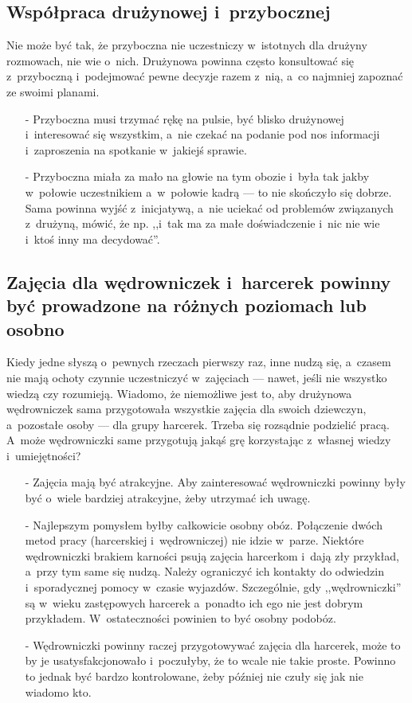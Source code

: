 \subsection{Współpraca drużynowej i~przybocznej}
Nie może być tak, że przyboczna nie uczestniczy w~istotnych dla drużyny rozmowach, nie wie o~nich. Drużynowa powinna często konsultować się z~przyboczną i~podejmować pewne decyzje razem z~nią, a~co najmniej zapoznać ze swoimi planami.
\begin{itemize}
\item[-] Przyboczna musi trzymać rękę na pulsie, być blisko drużynowej i~interesować się wszystkim, a~nie czekać na podanie pod nos informacji i~zaproszenia na spotkanie w~jakiejś sprawie.
\item[-] Przyboczna miała za mało na głowie na tym obozie i~była tak jakby w~połowie uczestnikiem a~w~połowie kadrą --- to nie skończyło się dobrze. Sama powinna wyjść z~inicjatywą, a~nie uciekać od problemów związanych z~drużyną, mówić, że np. ,,i~tak ma za małe doświadczenie i~nic nie wie i~ktoś inny ma decydować''.
\end{itemize}
\subsection{Zajęcia dla wędrowniczek i~harcerek powinny być prowadzone na różnych poziomach lub osobno}
Kiedy jedne słyszą o~pewnych rzeczach pierwszy raz, inne nudzą się, a~czasem nie mają ochoty czynnie uczestniczyć w~zajęciach --- nawet, jeśli nie wszystko wiedzą czy rozumieją. Wiadomo, że niemożliwe jest to, aby drużynowa wędrowniczek sama przygotowała wszystkie zajęcia dla swoich dziewczyn, a~pozostałe osoby --- dla grupy harcerek. Trzeba się rozsądnie podzielić pracą. A~może wędrowniczki same przygotują jakąś grę korzystając z~własnej wiedzy i~umiejętności?
\begin{itemize}
\item[-] Zajęcia mają być atrakcyjne. Aby zainteresować wędrowniczki powinny były być o~wiele bardziej atrakcyjne, żeby utrzymać ich uwagę.
\item[-] Najlepszym pomysłem byłby całkowicie osobny obóz. Połączenie dwóch metod pracy (harcerskiej i~wędrowniczej) nie idzie w~parze. Niektóre wędrowniczki brakiem karności psują zajęcia harcerkom i~dają zły przykład, a~przy tym same się nudzą. Należy ograniczyć ich kontakty do odwiedzin i~sporadycznej pomocy w~czasie wyjazdów. Szczególnie, gdy ,,wędrowniczki'' są w~wieku zastępowych harcerek a~ponadto ich ego nie jest dobrym przykładem. W~ostateczności powinien to być osobny podobóz.
\item[-] Wędrowniczki powinny raczej przygotowywać zajęcia dla harcerek, może to by je usatysfakcjonowało i~poczułyby, że to wcale nie takie proste. Powinno to jednak być bardzo kontrolowane, żeby później nie czuły się jak nie wiadomo kto.
\end{itemize}
